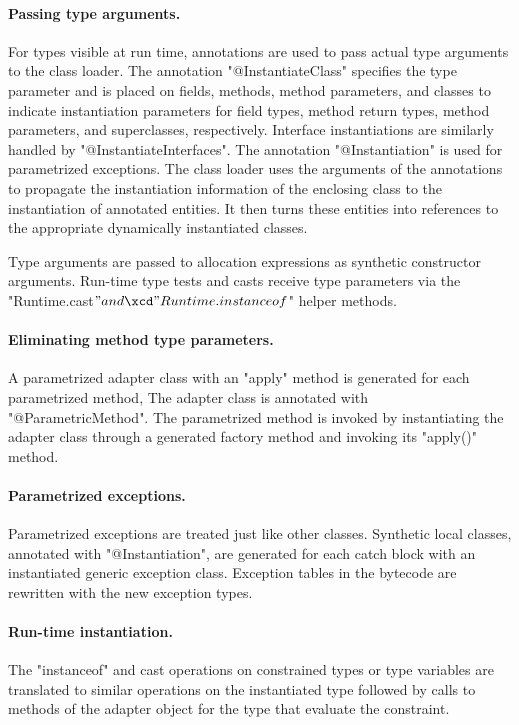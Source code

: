\paragraph{Passing type arguments.}

For types visible at run time, annotations are used to
pass actual type arguments to the class loader.
The annotation \xcd"@InstantiateClass"
specifies the type parameter and
is placed on
fields, methods,
method parameters, and classes to
indicate instantiation parameters for field
types, method return types, method parameters, and superclasses,
respectively.
Interface instantiations are similarly handled
by \xcd"@InstantiateInterfaces".
The annotation
\xcd"@Instantiation"
is used for parametrized exceptions.
The class loader uses the arguments of the annotations to
propagate the instantiation information of the enclosing class
to the instantiation of annotated entities.  It then turns these
entities into references to the appropriate dynamically
instantiated classes.

Type arguments are passed to allocation expressions as
synthetic constructor arguments.  Run-time type tests and casts
receive type parameters via the \xcd"Runtime.cast$" and
\xcd"Runtime.instanceof$" helper methods.

\paragraph{Eliminating method type parameters.}

A parametrized
adapter class with an \xcd"apply" method
is generated for each parametrized method,
The adapter class
is annotated with \xcd"@ParametricMethod".
The parametrized method is invoked by instantiating the adapter
class through a generated factory method
and invoking its \xcd"apply()" method.

\paragraph{Parametrized exceptions.}

Parametrized exceptions are treated just like other classes.
Synthetic local classes, annotated with \xcd"@Instantiation",
are generated for each catch block with an instantiated
generic exception class.  Exception tables in the
bytecode are rewritten with the new exception types.

\paragraph{Run-time instantiation.}

The
\xcd"instanceof" and cast operations on
constrained types or type variables
are translated
to
similar operations on the instantiated type followed by calls
to
methods of the adapter object for the type
that evaluate the constraint.
